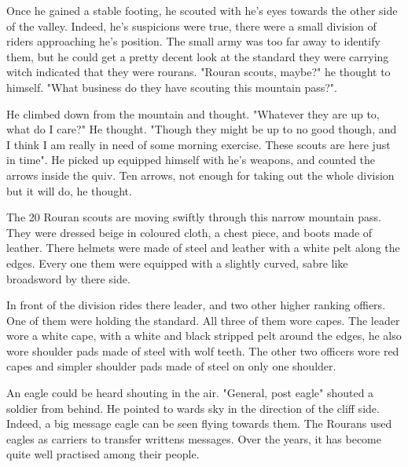 Once he gained a stable footing, he scouted with he's eyes towards the other side of the valley. Indeed, he's suspicions were true, there were a small division of riders approaching he's position. The small army was too far away to identify them, but he could get a pretty decent look at the standard they were carrying witch indicated that they were rourans. "Rouran scouts, maybe?" he thought to himself. "What business do they have scouting this mountain pass?".

He climbed down from the mountain and thought. "Whatever they are up to, what do I care?" He thought. "Though they might be up to no good though, and I think I am really in need of some morning exercise. These scouts are here just in time". He picked up equipped himself with he's weapons, and counted the arrows inside the quiv. Ten arrows, not enough for taking out the whole division but it will do, he thought.

\newsect

The 20 Rouran scouts are moving swiftly through this narrow mountain pass. They were dressed beige in coloured cloth, a chest piece, and boots made of leather. There helmets were made of steel and leather with a white pelt along the edges. Every one them were equipped with a slightly curved, sabre like broadsword by there side.

In front of the division rides there leader, and two other higher ranking offiers. One of them were holding the standard. All three of them wore capes. The leader wore a white cape, with a white and black stripped pelt around the edges, he also wore shoulder pads made of steel with wolf teeth. The other two officers wore red capes and simpler shoulder pads made of steel on only one shoulder.

An eagle could be heard shouting in the air.
"General, post eagle" shouted a soldier from behind. He pointed to wards sky in the direction of the cliff side. Indeed, a big message eagle can be seen flying towards them. The Rourans used eagles as carriers to transfer writtens messages. Over the years, it has become quite well practised among their people.
